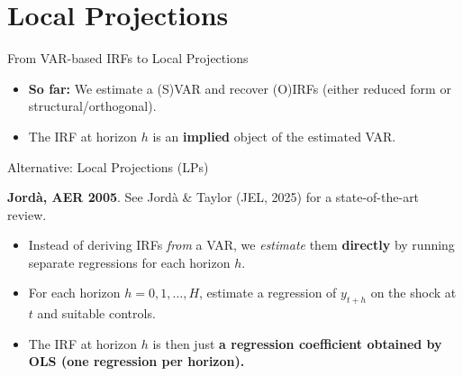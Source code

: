 \documentclass{beamer}
\begin{document}
\section{Local Projections}

\begin{frame}{From VAR-based IRFs to Local Projections}
\small

\begin{itemize}
  \item \textbf{So far:} We estimate a (S)VAR and recover (O)IRFs (either reduced form or structural/orthogonal). 
  \item The IRF at horizon $h$ is an \textbf{implied} object of the estimated VAR.
\end{itemize}

\pause

\begin{block}{Alternative: Local Projections (LPs)}
    
\textbf{Jordà, AER 2005}. See Jordà \& Taylor (JEL, 2025) for a state-of-the-art review.

\begin{itemize}
  \item Instead of deriving IRFs \emph{from} a VAR, we \emph{estimate} them
        \textbf{directly} by running separate regressions for each horizon $h$.
  \item For each horizon $h = 0,1,\dots,H$, estimate a regression of $y_{t+h}$
        on the shock at $t$ and suitable controls.
  \item The IRF at horizon $h$ is then just \textbf{a regression coefficient obtained by OLS
(one regression per horizon).}
\end{itemize}
\end{block}
\end{frame}
\end{document}
